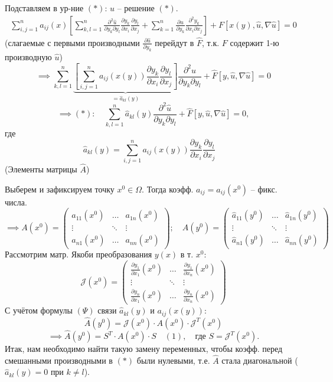 \documentclass[12pt, a4paper]{article}
\begin{document}
Подставляем в ур-ние $(*)$: $u$ -- решение $(*)$.
\begin{align*} \label{eq:star_transform_full}
\sum_{i,j=1}^n a_{ij}(x) \left[ \sum_{k,l=1}^n \frac{\partial^2 \hat{u}}{\partial y_k \partial y_l} \frac{\partial y_k}{\partial x_i} \frac{\partial y_l}{\partial x_j} + \sum_{k=1}^n \frac{\partial \hat{u}}{\partial y_k} \frac{\partial^2 y_k}{\partial x_i \partial x_j} \right] + F[x(y), \hat{u}, \nabla \hat{u}] = 0
\end{align*}
(слагаемые с первыми производными $\frac{\partial \hat{u}}{\partial y_k}$ перейдут в $\hat{F}$, т.к. $F$ содержит 1-ю производную $\hat{u}$)
\[
\implies \sum_{k,l=1}^n \underbrace{\left[ \sum_{i,j=1}^n a_{ij}(x(y)) \frac{\partial y_k}{\partial x_i} \frac{\partial y_l}{\partial x_j} \right]}_{= \hat{a}_{kl}(y)} \frac{\partial^2 \hat{u}}{\partial y_k \partial y_l} + \hat{F}[y, \hat{u}, \nabla \hat{u}] = 0
\]
\[
\implies (*): \quad \sum_{k,l=1}^n \hat{a}_{kl}(y) \frac{\partial^2 \hat{u}}{\partial y_k \partial y_l} + \hat{F}[y, \hat{u}, \nabla \hat{u}] = 0,
\]
где
\[
\hat{a}_{kl}(y) = \sum_{i,j=1}^n a_{ij}(x(y)) \frac{\partial y_k}{\partial x_i} \frac{\partial y_l}{\partial x_j} \quad \tag{$\Psi$}
\]
(Элементы матрицы $\hat{A}$)



Выберем и зафиксируем точку $x^0 \in \Omega$. Тогда коэфф. $a_{ij} = a_{ij}(x^0)$ -- фикс. числа.
\[
\implies A(x^0) = \begin{pmatrix}
a_{11}(x^0) & \dots & a_{1n}(x^0) \\
\vdots & \ddots & \vdots \\
a_{n1}(x^0) & \dots & a_{nn}(x^0)
\end{pmatrix}; \quad
\hat{A}(y^0) = \begin{pmatrix}
\hat{a}_{11}(y^0) & \dots & \hat{a}_{1n}(y^0) \\
\vdots & \ddots & \vdots \\
\hat{a}_{n1}(y^0) & \dots & \hat{a}_{nn}(y^0)
\end{pmatrix}
\]
Рассмотрим матр. Якоби преобразования $y(x)$ в т. $x^0$:
\[
\mathcal{J}(x^0) = \begin{pmatrix}
\frac{\partial y_1}{\partial x_1}(x^0) & \dots & \frac{\partial y_1}{\partial x_n}(x^0) \\
\vdots & \ddots & \vdots \\
\frac{\partial y_n}{\partial x_1}(x^0) & \dots & \frac{\partial y_n}{\partial x_n}(x^0)
\end{pmatrix}
\]
С учётом формулы $(\Psi)$ связи $\hat{a}_{kl}(y)$ и $a_{ij}(x(y))$:
\[
\hat{A}(y^0) = \mathcal{J}(x^0) \cdot A(x^0) \cdot \mathcal{J}^T(x^0)
\]
\[
\implies \boxed{\hat{A}(y^0) = S^T \cdot A(x^0) \cdot S \quad (1)}, \quad \text{где } S = \mathcal{J}^T(x^0).
\]
Итак, нам необходимо найти такую замену переменных, чтобы коэфф. перед смешанными производными в $(*)$ были нулевыми, т.е. $\hat{A}$ стала диагональной ($\hat{a}_{kl}(y)=0$ при $k \ne l$).
\end{document}
